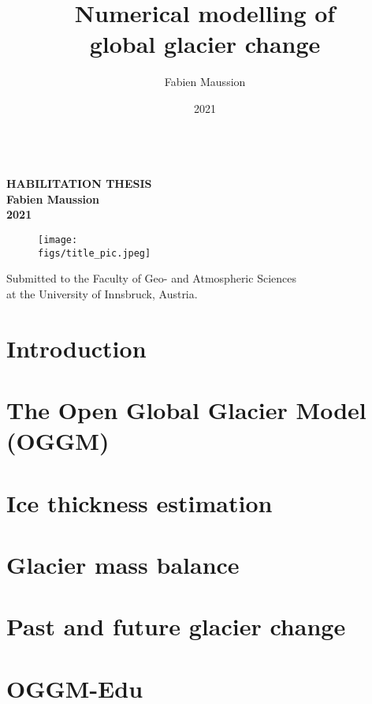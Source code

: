 \documentclass[twoside,10pt,openright]{scrbook} %
\author{Fabien Maussion}
\title{Numerical modelling of \\ global glacier change}
\subtitle{}
\date{2021}
\makeatletter
\newcommand{\figs}{../habil/img}
\renewcommand{\maketitle}{\begin{titlepage}%
  
	\begin{center}
	  	\vspace*{0cm}
		\Huge \bfseries \MakeUppercase{\@title} \mdseries \\[1.5cm]
				
		\Large \MakeUppercase{Habilitation thesis} \\	[1cm]		
		\Large Fabien Maussion \\	[0.1cm]		
		\large 2021 \\ [4.5cm]

		\begin{figure}[h!]
		\texttt{[image: \\figs/title\_pic.jpeg]} \\ [3cm]
		\end{figure}

		\large Submitted to the Faculty of Geo- and Atmospheric Sciences \\ at the University of Innsbruck, Austria.
	\end{center}
  \end{titlepage}%
  \setcounter{footnote}{0}%
}
\makeatother
\begin{document}
\setcounter{tocdepth}{1}

\maketitle

\frontmatter



\cleardoublepage
\renewcommand*\contentsname{Table of contents}
\tableofcontents

\mainmatter

\chapter{Introduction}
\label{chap1}



\chapter{The Open Global Glacier Model (OGGM)}
\label{chap2}




\chapter{Ice thickness estimation}
\label{chap3}






\chapter{Glacier mass balance}
\label{chap4}






\chapter{Past and future glacier change}
\label{chap5}






\chapter{OGGM-Edu}
\label{chap6}
\end{document}
